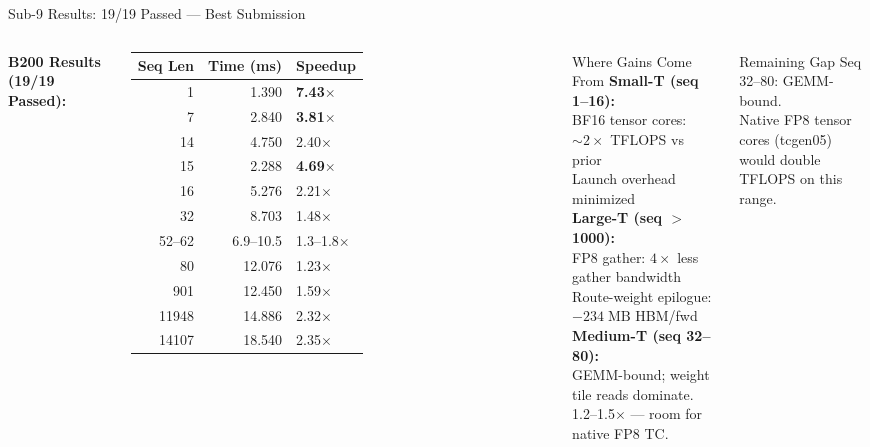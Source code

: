 \begin{frame}{Sub-9 Results: 19/19 Passed --- Best Submission}
\begin{columns}[T]
\small\textbf{B200 Results (19/19 Passed):}
\smallskip
\scriptsize
\begin{tabular}{rrl}
\toprule
Seq Len & Time (ms) & Speedup \\
\midrule
1      & 1.390  & \textbf{7.43}$\times$ \\
7      & 2.840  & \textbf{3.81}$\times$ \\
14     & 4.750  & 2.40$\times$ \\
15     & 2.288  & \textbf{4.69}$\times$ \\
16     & 5.276  & 2.21$\times$ \\
32     & 8.703  & 1.48$\times$ \\
52--62 & 6.9--10.5 & 1.3--1.8$\times$ \\
80     & 12.076 & 1.23$\times$ \\
901    & 12.450 & 1.59$\times$ \\
11948  & 14.886 & 2.32$\times$ \\
14107  & 18.540 & 2.35$\times$ \\
\bottomrule
\end{tabular}

\begin{exampleblock}{\small Where Gains Come From}
\scriptsize
\textbf{Small-T (seq 1--16):}\\
BF16 tensor cores: $\sim\!2\times$ TFLOPS vs prior\\
Launch overhead minimized\\[4pt]
\textbf{Large-T (seq $>$1000):}\\
FP8 gather: $4\times$ less gather bandwidth\\
Route-weight epilogue: $-234\;\text{MB}$ HBM/fwd\\[4pt]
\textbf{Medium-T (seq 32--80):}\\
GEMM-bound; weight tile reads dominate.\\
1.2--1.5$\times$ --- room for native FP8 TC.
\end{exampleblock}

\begin{alertblock}{\small Remaining Gap}
\scriptsize
Seq 32--80: GEMM-bound.\\
Native FP8 tensor cores (tcgen05)\\
would double TFLOPS on this range.
\end{alertblock}
\end{columns}
\end{frame}
